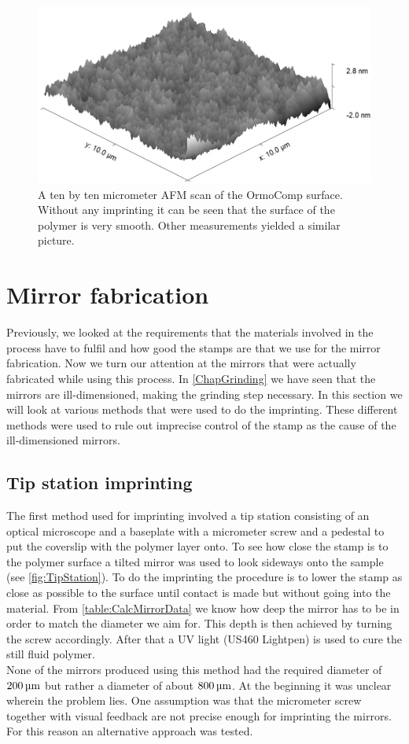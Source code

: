 \begin{figure}[H]
	\includegraphics[scale=0.5]{source/OrmoComp_rms}
	\caption{A ten by ten micrometer AFM scan of the OrmoComp surface. Without any imprinting it can be seen that the surface of the polymer is very smooth. Other measurements yielded a similar picture.}
\end{figure}

\section{Mirror fabrication}\label{ChapMirrorFab}
Previously, we looked at the requirements that the materials involved in the process have to fulfil and how good the stamps are that we use for the mirror fabrication. Now we turn our attention at the mirrors that were actually fabricated while using this process. In \autoref{ChapGrinding} we have seen that the mirrors are ill-dimensioned, making the grinding step necessary. In this section we will look at various methods that were used to do the imprinting. These different methods were used to rule out imprecise control of the stamp as the cause of the ill-dimensioned mirrors.

\subsection{Tip station imprinting}
The first method used for imprinting involved a tip station consisting of an optical microscope and a baseplate with a micrometer screw and a pedestal to put the coverslip with the polymer layer onto. To see how close the stamp is to the polymer surface a tilted mirror was used to look sideways onto the sample (see \autoref{fig:TipStation}). To do the imprinting the procedure is to lower the stamp as close as possible to the surface until contact is made but without going into the material. From \autoref{table:CalcMirrorData} we know how deep the mirror has to be in order to match the diameter we aim for. This depth is then achieved by turning the screw accordingly. After that a UV light (US460 Lightpen) is used to cure the still fluid polymer.\\
None of the mirrors produced using this method had the required diameter of $200\um$ but rather a diameter of about $800\um$.  At the beginning it was unclear wherein the problem lies. One assumption was that the micrometer screw together with visual feedback are not precise enough for imprinting the mirrors. For this reason an alternative approach was tested.

